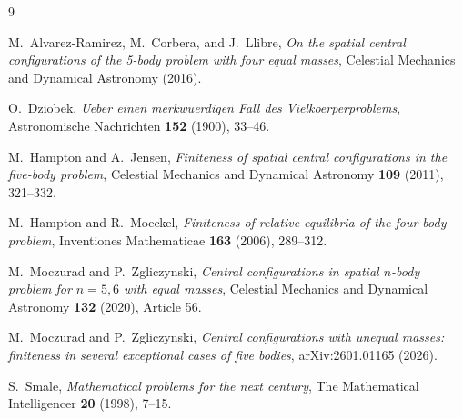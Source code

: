 \documentclass[11pt,a4paper]{amsart}
\theoremstyle{definition}
\theoremstyle{remark}
\begin{document}
\begin{thebibliography}{9}

M.~Alvarez-Ramirez, M.~Corbera, and J.~Llibre,
\emph{On the spatial central configurations of the 5-body problem with four equal masses},
Celestial Mechanics and Dynamical Astronomy (2016).

O.~Dziobek,
\emph{Ueber einen merkwuerdigen Fall des Vielkoerperproblems},
Astronomische Nachrichten \textbf{152} (1900), 33--46.

M.~Hampton and A.~Jensen,
\emph{Finiteness of spatial central configurations in the five-body problem},
Celestial Mechanics and Dynamical Astronomy \textbf{109} (2011), 321--332.

M.~Hampton and R.~Moeckel,
\emph{Finiteness of relative equilibria of the four-body problem},
Inventiones Mathematicae \textbf{163} (2006), 289--312.

M.~Moczurad and P.~Zgliczynski,
\emph{Central configurations in spatial $n$-body problem for $n=5,6$ with equal masses},
Celestial Mechanics and Dynamical Astronomy \textbf{132} (2020), Article 56.

M.~Moczurad and P.~Zgliczynski,
\emph{Central configurations with unequal masses: finiteness in several exceptional cases of five bodies},
arXiv:2601.01165 (2026).

S.~Smale,
\emph{Mathematical problems for the next century},
The Mathematical Intelligencer \textbf{20} (1998), 7--15.

\end{thebibliography}
\end{document}
